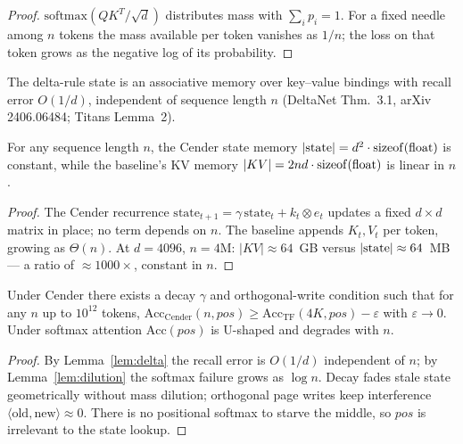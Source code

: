 \begin{proof}
$\mathrm{softmax}(QK^T/\sqrt{d})$ distributes mass with $\sum_i p_i = 1$. For a fixed needle
among $n$ tokens the mass available per token vanishes as $1/n$; the loss on that token grows
as the negative log of its probability. \end{proof}

\begin{lemma}\label{lem:delta}
The delta-rule state is an associative memory over key--value bindings with recall error
$O(1/d)$, independent of sequence length $n$ (DeltaNet Thm.~3.1, arXiv 2406.06484; Titans
Lemma~2).
\end{lemma}

\begin{theorem}\label{thm:memory}
For any sequence length $n$, the Cender state memory $|{\rm state}| = d^2 \cdot
{\rm sizeof}(\mathrm{float})$ is constant, while the baseline's KV memory
$|KV| = 2nd \cdot {\rm sizeof}(\mathrm{float})$ is linear in $n$.
\end{theorem}

\begin{proof}
The Cender recurrence $\mathrm{state}_{t+1} = \gamma\,\mathrm{state}_t + k_t \otimes e_t$
updates a fixed $d \times d$ matrix in place; no term depends on $n$. The baseline appends
$K_t, V_t$ per token, growing as $\Theta(n)$. At $d{=}4096$, $n{=}4\mathrm{M}$:
$|KV| \approx 64$~GB versus $|{\rm state}| \approx 64$~MB --- a ratio of ${\approx}1000\times$,
constant in $n$.
\end{proof}

\begin{theorem}\label{thm:rot}
Under Cender there exists a decay $\gamma$ and orthogonal-write condition such that for any
$n$ up to $10^{12}$ tokens, $\mathrm{Acc}_{\mathrm{Cender}}(n, pos) \ge
\mathrm{Acc}_{\mathrm{TF}}(4K, pos) - \varepsilon$ with $\varepsilon \to 0$. Under softmax
attention $\mathrm{Acc}(pos)$ is U-shaped and degrades with $n$.
\end{theorem}

\begin{proof}
By Lemma~\ref{lem:delta} the recall error is $O(1/d)$ independent of $n$; by Lemma~\ref{lem:dilution}
the softmax failure grows as $\log n$. Decay fades stale state geometrically without mass
dilution; orthogonal page writes keep interference $\langle \mathrm{old}, \mathrm{new}\rangle
\approx 0$. There is no positional softmax to starve the middle, so $pos$ is irrelevant to the
state lookup.
\end{proof}

